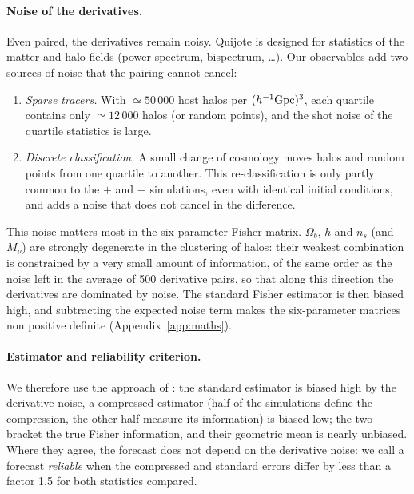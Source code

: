 \paragraph{Noise of the derivatives.} Even paired, the derivatives remain noisy. Quijote is designed for statistics of the matter and halo fields (power spectrum, bispectrum, \dots). Our observables add two sources of noise that the pairing cannot cancel:
\begin{enumerate}
\item \emph{Sparse tracers.} With $\simeq50\,000$ host halos per $(h^{-1}{\rm Gpc})^3$, each quartile contains only $\simeq12\,000$ halos (or random points), and the shot noise of the quartile statistics is large.
\item \emph{Discrete classification.} A small change of cosmology moves halos and random points from one quartile to another. This re-classification is only partly common to the $+$ and $-$ simulations, even with identical initial conditions, and adds a noise that does not cancel in the difference.
\end{enumerate}
This noise matters most in the six-parameter Fisher matrix. $\Omega_b$, $h$ and $n_s$ (and $M_\nu$) are strongly degenerate in the clustering of halos: their weakest combination is constrained by a very small amount of information, of the same order as the noise left in the average of 500 derivative pairs, so that along this direction the derivatives are dominated by noise. The standard Fisher estimator is then biased high, and subtracting the expected noise term makes the six-parameter matrices non positive definite (Appendix~\ref{app:maths}).

\paragraph{Estimator and reliability criterion.} We therefore use the approach of \cite{CoultonWandelt2023}: the standard estimator is biased high by the derivative noise, a compressed estimator (half of the simulations define the compression, the other half measure its information) is biased low; the two bracket the true Fisher information, and their geometric mean is nearly unbiased. Where they agree, the forecast does not depend on the derivative noise: we call a forecast \emph{reliable} when the compressed and standard errors differ by less than a factor 1.5 for both statistics compared.


